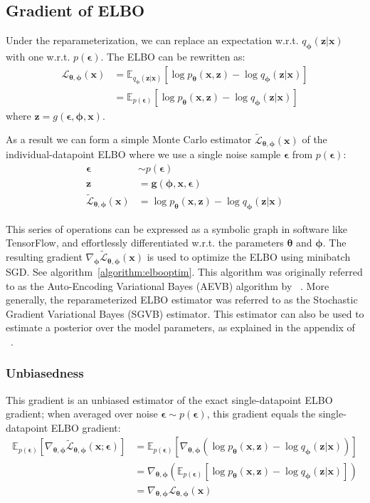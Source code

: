 \documentclass[MAL,biber]{nowfnt} %
\newcommand{\bb}[1]{\mathbf{#1}}
\newcommand{\bx}{\bb{x}}
\newcommand{\bg}{\bb{g}}
\newcommand{\bz}{\bb{z}}
\newcommand{\bT}{\boldsymbol{\theta}}
\newcommand{\bphi}{\boldsymbol{\phi}}
\newcommand{\beps}{\boldsymbol{\epsilon}}
\newcommand{\pT}{p_{\bT}}
\newcommand{\qP}{q_{\bphi}}
\newcommand{\Exp}[2]{\mathbb{E}_{#1}\left[#2\right]}
\newcommand{\ELBO}{\mathcal{L}_{\bT,\bphi}}
\newcommand{\TELBO}{\tilde{\mathcal{L}}_{\bT,\bphi}}
\begin{document}
\subsection{Gradient of ELBO}

Under the reparameterization, we can replace an expectation w.r.t. $\qP(\bz|\bx)$ with one w.r.t. $p(\beps)$. The ELBO can be rewritten as:
\begin{align}
\ELBO(\bx) &= \Exp{\qP(\bz|\bx)}{ \log \pT(\bx,\bz) - \log \qP(\bz|\bx) }\\
&= \Exp{p(\beps)}{\log \pT(\bx,\bz) - \log \qP(\bz|\bx) }
\end{align}
where $\bz = g(\beps,\bphi,\bx)$.

As a result we can form a simple Monte Carlo estimator $\TELBO(\bx)$ of the individual-datapoint ELBO where we use a single noise sample $\beps$ from $p(\beps)$:
\begin{align}
\beps &\sim  p(\beps)\\
\bz &= \bg(\bphi,\bx,\beps)\\
\TELBO(\bx) &=  \log \pT(\bx,\bz) - \log \qP(\bz|\bx)
\end{align}

This series of operations can be expressed as a symbolic graph in software like TensorFlow, and effortlessly differentiated w.r.t. the parameters $\bT$ and $\bphi$. The resulting gradient $\nabla_{\bphi} \TELBO(\bx)$ is used to optimize the ELBO using minibatch SGD. See algorithm~\ref{algorithm:elbooptim}. This algorithm was originally referred to as the Auto-Encoding Variational Bayes (AEVB) algorithm by ~\cite{kingma2013auto}. More generally, the reparameterized ELBO estimator was referred to as the Stochastic Gradient Variational Bayes (SGVB) estimator. This estimator can also be used to estimate a posterior over the model parameters, as explained in the appendix of ~\citep{kingma2013auto}.

\subsubsection{Unbiasedness}
This gradient is an unbiased estimator of the exact single-datapoint ELBO gradient; when averaged over noise $\beps \sim p(\beps)$, this gradient equals the single-datapoint ELBO gradient:
\begin{align}
\Exp{p(\beps)}{\nabla_{\bT,\bphi} \TELBO(\bx;\beps)}
&= \Exp{p(\beps)}{\nabla_{\bT,\bphi}  (\log \pT(\bx,\bz) - \log \qP(\bz|\bx)) }\\
&= \nabla_{\bT,\bphi} ( \Exp{p(\beps)}{\log \pT(\bx,\bz) - \log \qP(\bz|\bx) } )\\
&= \nabla_{\bT,\bphi} \ELBO(\bx) 
\end{align}
\end{document}
